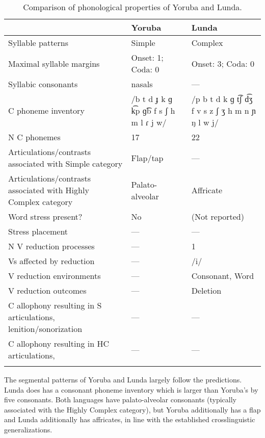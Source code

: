 \begin{table}
\begin{tabularx}{\textwidth}{Qp{3cm}p{3cm}}
\lsptoprule
 & \textbf{Yoruba} & \textbf{Lunda}\\
 \midrule 
 {Syllable patterns} & Simple & Complex\\
 \tablevspace
 {Maximal syllable margins} & Onset: 1; Coda: 0 & Onset: 3; Coda: 0\\
 \tablevspace
 {Syllabic consonants} & nasals & —\\
 \tablevspace
 {C phoneme inventory} & /b t d ɟ k ɡ k͡p ɡ͡b f s ʃ h m l ɾ j w/ & /p b t d k ɡ t͡ʃ d͡ʒ f v s z ʃ ʒ h m n ɲ ŋ l w j/\\
 \tablevspace
 {N C phonemes} & 17 & 22\\
 \tablevspace
 {Articulations/contrasts associated with {Simple}} {category} & {Flap/tap} & {—}\\
 \tablevspace
 {Articulations/contrasts associated with {Highly Complex}} {category} & {Palato-alveolar} & { {Affricate}}\\
 \tablevspace
 {Word stress present?} & {No} & {(Not reported)}\\
 \tablevspace
 {Stress placement} & {—} & {—}\\
 \tablevspace
 {N V reduction processes} & {—} & {1}\\
 \tablevspace
 {Vs affected by reduction}  & {—} & {/i/}\\
 \tablevspace
 {V reduction environments} & {—} & {Consonant, Word}\\
 \tablevspace
 {V reduction outcomes} & {—} & {Deletion}\\
 \tablevspace
 {C allophony resulting in S articulations, lenition/sonorization} & {—} & {—}\\
 \tablevspace
{ {C allophony resulting in HC articulations,} } & {—} & {—}\\
\lspbottomrule
\end{tabularx}
\caption{\label{tab:8.4}Comparison of phonological properties of Yoruba and Lunda.}
\end{table}

  The segmental patterns of Yoruba and Lunda largely follow the predictions. Lunda does has a consonant phoneme inventory which is larger than Yoruba’s by five consonants. Both languages have palato-alveolar consonants (typically associated with the Highly Complex category), but Yoruba additionally has a flap and Lunda additionally has affricates, in line with the established crosslinguistic generalizations.

